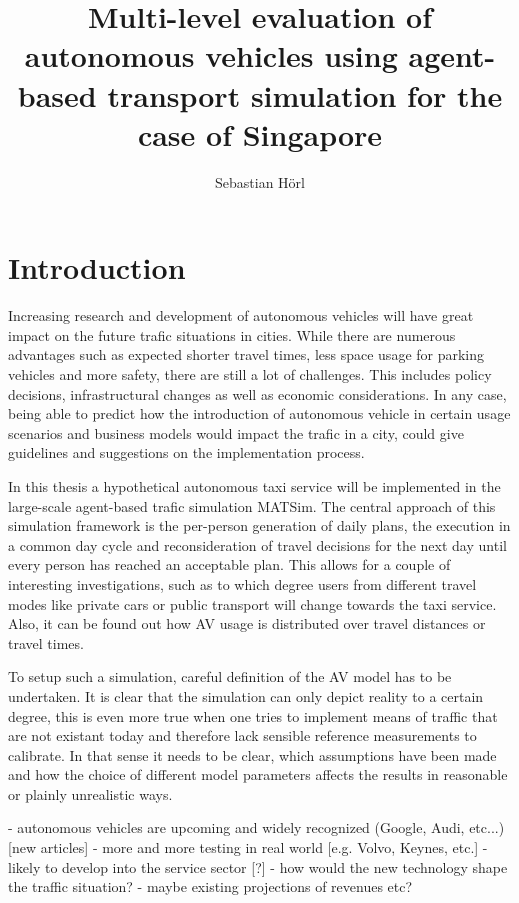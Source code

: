 \documentclass[10pt,a4paper,draft]{report}
\author{Sebastian Hörl}
\title{Multi-level evaluation of autonomous vehicles using agent-based
transport simulation for the case of Singapore}
\begin{document}
\maketitle

\tableofcontents

\chapter{Introduction}

Increasing research and development of autonomous vehicles will have great impact on the future trafic situations in cities. While there are numerous advantages such as expected shorter travel times, less space usage for parking vehicles and more safety, there are still a lot of challenges. This includes policy decisions, infrastructural changes as well as economic considerations. In any case, being able to predict how the introduction of autonomous vehicle in certain usage scenarios and business models would impact the trafic in a city, could give guidelines and suggestions on the implementation process.

In this thesis a hypothetical autonomous taxi service will be implemented in the large-scale agent-based trafic simulation MATSim. The central approach of this simulation framework is the per-person generation of daily plans, the execution in a common day cycle and reconsideration of travel decisions for the next day until every person has reached an acceptable plan. This allows for a couple of interesting investigations, such as to which degree users from different travel modes like private cars or public transport will change towards the taxi service. Also, it can be found out how AV usage is distributed over travel distances or travel times.

To setup such a simulation, careful definition of the AV model has to be undertaken. It is clear that the simulation can only depict reality to a certain degree, this is even more true when one tries to implement means of traffic that are not existant today and therefore lack sensible reference measurements to calibrate. In that sense it needs to be clear, which assumptions have been made and how the choice of different model parameters affects the results in reasonable or plainly unrealistic ways.

\iffalse
- autonomous vehicles are upcoming and widely recognized (Google, Audi, etc...) [new articles]
- more and more testing in real world [e.g. Volvo, Keynes, etc.]
- likely to develop into the service sector [?]
- how would the new technology shape the traffic situation?
- maybe existing projections of revenues etc?
\end{document}
